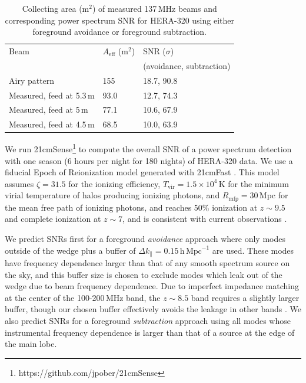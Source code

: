  \begin{table}[h]
 \caption[Collecting area of 137\,MHz HERA beams and resulting SNR predictions.]{ \label{table:collectingareatable}Collecting area (m$^2$) of measured 137\,MHz beams and corresponding power spectrum SNR for HERA-320 using either foreground avoidance or foreground subtraction.}
\begin{tabular}{| l | l | l |}
\hline
Beam & $A_\text{eff}$ (m$^2$) & SNR ($\sigma$)\\
&& (avoidance, subtraction)\\
\hline
  Airy pattern & 155 & 18.7, 90.8  \\
    Measured, feed at 5.3\,m & 93.0 & 12.7, 74.3 \\
    Measured, feed at 5\,m & 77.1 &  10.6, 67.9 \\
    Measured, feed at 4.5\,m & 68.5 &  10.0, 63.9 \\ 
  \hline
\end{tabular}
\end{table}

We run 21cmSense\footnote{https://github.com/jpober/21cmSense} to compute the overall SNR of a power spectrum detection with one season (6 hours per night for 180 nights) of HERA-320 data. We use a fiducial Epoch of Reionization model generated with 21cmFast \citep{21cmfast}. This model assumes $\zeta=31.5$ for the ionizing efficiency, $T_\mathrm{vir}=1.5\times10^4$\,K for the minimum virial temperature of halos producing ionizing photons, and $R_\text{mfp}=30$\,Mpc for the mean free path of ionizing photons, and reaches 50\% ionization at $z \sim 9.5$ and complete ionization at $z \sim 7$, and is consistent with current observations \citep[e.g.][]{PoberNextGen}. 

We predict SNRs first for a foreground \textit{avoidance} approach where only modes outside of the wedge plus a buffer of $\Delta k_\parallel=0.15\,\mathrm{h}\,\mathrm{Mpc}^{-1}$ are used. These modes have frequency dependence larger than that of any smooth spectrum source on the sky, and this buffer size is chosen to exclude modes which leak out of the wedge due to beam frequency dependence. Due to imperfect impedance matching at the center of the 100-200\,MHz band, the $z\sim8.5$ band requires a slightly larger buffer, though our chosen buffer effectively avoids the leakage in other bands \citep{ewallwice16}. We also predict SNRs for a foreground \textit{subtraction} approach using all modes whose instrumental frequency dependence is larger than that of a source at the edge of the main lobe. 

